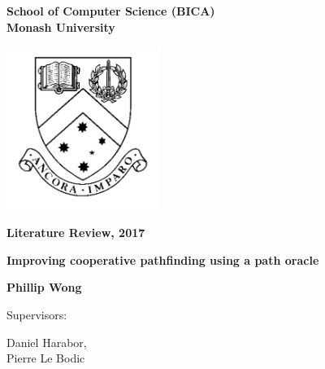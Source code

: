\documentclass[a4paper,11pt]{article}
\begin{document}
	
	\thispagestyle{empty} %
	\renewcommand{\thepage}{\roman{page}}
	
	\begin{spacing}{1.5}
		\begin{center}
			{\Large \bfseries
				School of Computer Science (BICA) \\
				Monash University}
			
			
			\vspace*{30mm}
			
			\includegraphics[width=5cm]{graphics/MonashCrest.pdf}
			
			\vspace*{15mm}
			
			{\large \bfseries
				Literature Review, 2017
			}
			
			\vspace*{10mm}
			
			{\LARGE \bfseries
				Improving cooperative pathfinding using a path oracle
			}
			
			\vspace*{20mm}
			
			{\large \bfseries
				Phillip Wong
				
				\vspace*{20mm}
				
				
				Supervisors: \parbox[t]{50mm}{Daniel Harabor,\\Pierre Le Bodic}
			}
			
		\end{center}
	\end{spacing}
	
	\newpage
	
	\tableofcontents
	
	\newpage
	\setcounter{page}{1}
	\renewcommand{\thepage}{\arabic{page}}
	
	
	
\end{document}
